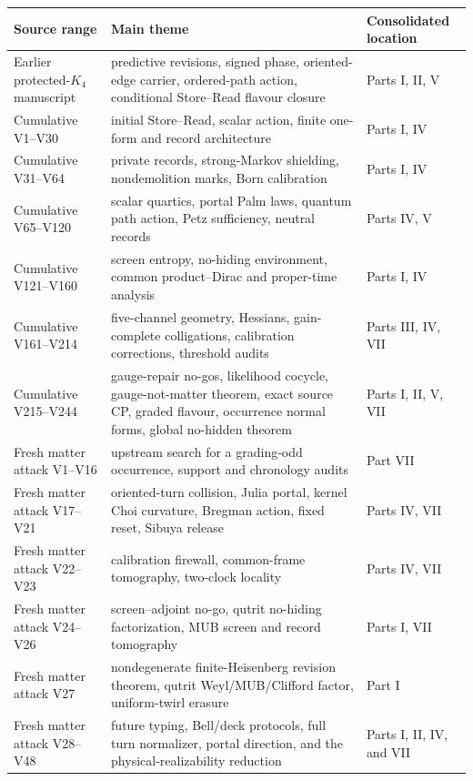 \documentclass[11pt,oneside,openany]{book}
\numberwithin{equation}{chapter}
\theoremstyle{definition}
\theoremstyle{remark}
\begin{document}
\begin{longtable}{@{}p{}p{}p{}@{}}
\toprule
Source range & Main theme & Consolidated location\\
\midrule
Earlier protected-\(K_4\) manuscript
& predictive revisions, signed phase, oriented-edge carrier, ordered-path
  action, conditional Store--Read flavour closure
& Parts I, II, V\\
Cumulative V1--V30
& initial Store--Read, scalar action, finite one-form and record architecture
& Parts I, IV\\
Cumulative V31--V64
& private records, strong-Markov shielding, nondemolition marks, Born
  calibration
& Parts I, IV\\
Cumulative V65--V120
& scalar quartics, portal Palm laws, quantum path action, Petz sufficiency,
  neutral records
& Parts IV, V\\
Cumulative V121--V160
& screen entropy, no-hiding environment, common product--Dirac and proper-time
  analysis
& Parts I, IV\\
Cumulative V161--V214
& five-channel geometry, Hessians, gain-complete colligations, calibration
  corrections, threshold audits
& Parts III, IV, VII\\
Cumulative V215--V244
& gauge-repair no-gos, likelihood cocycle, gauge-not-matter theorem, exact
  source CP, graded flavour, occurrence normal forms, global no-hidden theorem
& Parts I, II, V, VII\\
Fresh matter attack V1--V16
& upstream search for a grading-odd occurrence, support and chronology audits
& Part VII\\
Fresh matter attack V17--V21
& oriented-turn collision, Julia portal, kernel Choi curvature, Bregman action,
  fixed reset, Sibuya release
& Parts IV, VII\\
Fresh matter attack V22--V23
& calibration firewall, common-frame tomography, two-clock locality
& Parts IV, VII\\
Fresh matter attack V24--V26
& screen--adjoint no-go, qutrit no-hiding factorization, MUB screen and record
  tomography
& Parts I, VII\\
Fresh matter attack V27
& nondegenerate finite-Heisenberg revision theorem, qutrit Weyl/MUB/Clifford
  factor, uniform-twirl erasure
& Part I\\
Fresh matter attack V28--V48
& future typing, Bell/deck protocols, full turn normalizer, portal direction,
  and the physical-realizability reduction
& Parts I, II, IV, and VII\\

\end{longtable}
\end{document}
